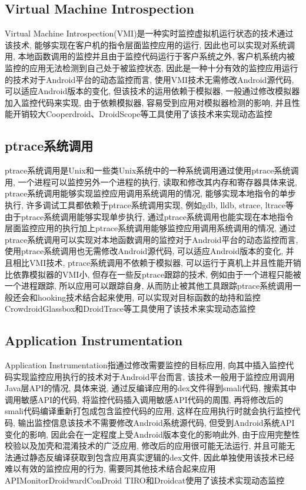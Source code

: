 \subsection{Virtual Machine Introspection}
Virtual Machine Introspection(VMI)是一种实时监控虚拟机运行状态的技术\juhao 通过该技术, 能够实现在客户机的指令层面监控应用的运行, 因此也可以实现对系统调用, 本地函数调用的监控\juhao 并且由于监控代码运行于客户系统之外, 客户机系统内被监控的应用无法检测到自己处于被监控状态, 因此是一种十分有效的监控应用运行的技术\juhao 对于Android平台的动态监控而言, 使用VMI技术无需修改Android源代码, 可以适应Android版本的变化, 但该技术的运用依赖于模拟器, 一般通过修改模拟器加入监控代码来实现, 由于依赖模拟器, 容易受到应用对模拟器检测的影响, 并且性能开销较大\juhao Cooperdroid、DroidScope等工具使用了该技术来实现动态监控\juhao

\subsection{ptrace系统调用}
ptrace系统调用是Unix和一些类Unix系统中的一种系统调用\juhao 通过使用ptrace系统调用, 一个进程可以监控另外一个进程的执行, 读取和修改其内存和寄存器\juhao 具体来说, ptrace系统调用能够实现监控应用调用系统调用的情况, 能够实现本地指令的单步执行, 许多调试工具都依赖于ptrace系统调用实现, 例如gdb, lldb, strace, ltrace等\juhao 由于ptrace系统调用能够实现单步执行, 通过ptrace系统调用也能实现在本地指令层面监控应用的执行\juhao 加上ptrace系统调用能够监控应用调用系统调用的情况, 通过ptrace系统调用可以实现对本地函数调用的监控\juhao 对于Android平台的动态监控而言, 使用ptrace系统调用也无需修改Android源代码, 可以适应Android版本的变化, 并且相比VMI技术, ptrace系统调用不依赖于模拟器, 可以运行于真机上并且性能开销比依靠模拟器的VMI小, 但存在一些反ptrace跟踪的技术, 例如由于一个进程只能被一个进程跟踪, 所以应用可以跟踪自身, 从而防止被其他工具跟踪\juhao ptrace系统调用一般还会和hooking技术结合起来使用, 可以实现对目标函数的劫持和监控\juhao Crowdroid\dunhao Glassbox和DroidTrace等工具使用了该技术来实现动态监控\juhao

\subsection{Application Instrumentation}
Application Instrumentation指通过修改需要监控的目标应用, 向其中插入监控代码实现监控应用执行的技术\juhao 对于Android平台而言, 该技术一般用于监控应用调用Java层API的情况, 具体来说, 通过反编译应用的dex文件得到smali代码, 搜索其中调用敏感API的代码, 将监控代码插入调用敏感API代码的周围, 再将修改后的smali代码编译重新打包成包含监控代码的应用, 这样在应用执行时就会执行监控代码, 输出监控信息\juhao 该技术不需要修改Android系统源代码, 但受到Android系统API变化的影响, 因此会在一定程度上受Android版本变化的影响\juhao 此外, 由于应用完整性校验以及加壳和混淆技术的广泛应用, 修改后的应用很可能无法运行, 并且可能无法通过静态反编译获取到包含应用真实逻辑的dex文件, 因此单独使用该技术已经难以有效的监控应用的行为, 需要同其他技术结合起来应用\juhao APIMonitor\dunhao Droidward\dunhao ConDroid \dunhao TIRO和Droidcat使用了该技术实现动态监控\juhao

